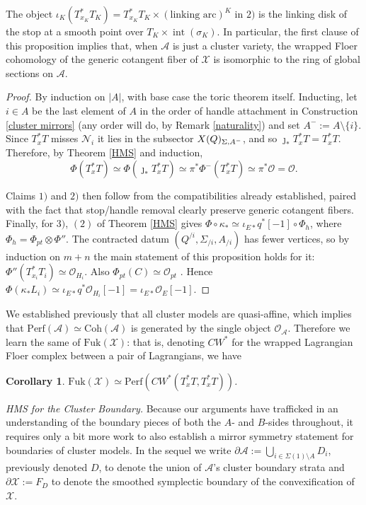 \documentclass[11pt]{amsart}
\newtheorem{cor}[thm]{Corollary}
\theoremstyle{definition}
\theoremstyle{remark}
\newcommand{\A}{\mathcal{A}}
\newcommand{\X}{\mathcal{X}}
\newcommand{\Coh}{\mathrm{Coh}}
\newcommand{\Fuk}{\mathrm{Fuk}}
\numberwithin{equation}{section}
\begin{document}
The object $\iota_K(T^*_{x_K}T_K)=T^*_{x_K}T_K\times(\text{linking arc})^K$ in $2)$ is the linking disk of the stop at a smooth point over $T_K\times\operatorname{int}(\sigma_K)$. In particular, the first clause of this proposition implies that, when $\A$ is just a cluster variety, the wrapped Floer cohomology of the generic cotangent fiber of $\X$ is isomorphic to the ring of global sections on $\A$. 
 
\begin{proof}
By induction on $|A|$, with base case the toric theorem itself. Inducting, let $i \in A$ be the last element of $A$ in the order of handle attachment in Construction \ref{cluster mirrors} (any order will do, by Remark \ref{naturality}) and set $A^-:=A\setminus\{i\}$. Since $T^*_xT$ misses $\mathcal N_i$ it lies in the subsector $\mathcal \X(Q)_{\Sigma,A^-}$, and so $\jmath_*T^*_xT=T^*_xT$. Therefore, by Theorem \ref{HMS} and induction,
$$\Phi(T^*_xT)\simeq\Phi(\jmath_*T^*_xT)\simeq\pi^*\Phi^-(T^*_xT)\simeq\pi^*\mathcal O=\mathcal O.$$

Claims $1)$ and $2)$ then follow from the compatibilities already established, paired with the fact that stop/handle removal clearly preserve generic cotangent fibers. Finally, for $3)$, $(2)$ of Theorem \ref{HMS} gives $\Phi\circ\kappa_*\simeq\iota_{E*}q^*[-1]\circ\Phi_h$, where $\Phi_h=\Phi_{pt} \otimes \Phi''$. The contracted datum $(Q^{/i},\Sigma_{/i},A_{/i})$ has fewer vertices, so by induction on $m+n$ the main statement of this proposition holds for it: $\Phi''(T^*_{x_i}T_i)\simeq\mathcal O_{H_i}$. Also $\Phi_{pt}(C)\simeq\mathcal O_{pt}$ \cite{GL}. Hence $\Phi(\kappa_*L_i)\simeq\iota_{E*}q^*\mathcal O_{H_i}[-1]=\iota_{E*}\mathcal O_E[-1]$.
\end{proof}

We established previously that all cluster models are quasi-affine, which implies that $\mathrm{Perf}(\A) \simeq \Coh(\A)$ is generated by the single object $\mathcal{O}_\A$. Therefore we learn the same of $\Fuk(\X)$: that is, denoting $CW^*$ for the wrapped Lagrangian Floer complex between a pair of Lagrangians, we have

\begin{cor}\label{single object gen}
    $\Fuk(\X) \simeq \mathrm{Perf}(CW^*(T^*_x T, T^*_x T))$.
\end{cor}

\noindent \textit{HMS for the Cluster Boundary.} Because our arguments have trafficked in an understanding of the boundary pieces of both the $A$- and $B$-sides throughout, it requires only a bit more work to also establish a mirror symmetry statement for boundaries of cluster models. In the sequel we write $\partial \A := \bigcup_{i \in \Sigma(1) \setminus A} D_i$, previously denoted $D$, to denote the union of $\A$'s cluster boundary strata and $\partial \X := F_D$ to denote the smoothed symplectic boundary of the convexification of $\X$.\\
\end{document}
